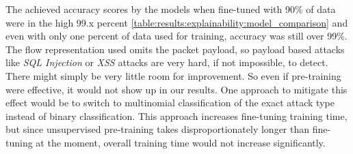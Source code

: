 \begin{table}[]
	\centering
	\caption{Absolute differences of validation accuracy between differently pre-trained transformer model and the same model without pre-training. The highest value of each row is marked bold.}
	\label{table:discussion:transformer:accuracy_differences}
\end{table}


The achieved accuracy scores by the models when fine-tuned with 90\% of data were in the high 99.x percent \ref{table:results:explainability:model_comparison} and even with only one percent of data used for training, accuracy was still over 99\%. The flow representation used omits the packet payload, so payload based attacks like \textit{SQL Injection} or \textit{XSS} attacks are very hard, if not impossible, to detect. There might simply be very little room for improvement. So even if pre-training were effective, it would not show up in our results. One approach to mitigate this effect would be to switch to multinomial classification of the exact attack type instead of binary classification. This approach increases fine-tuning training time, but since 
unsupervised pre-training takes disproportionately longer than fine-tuning at the moment, overall training time would not increase significantly. \par

